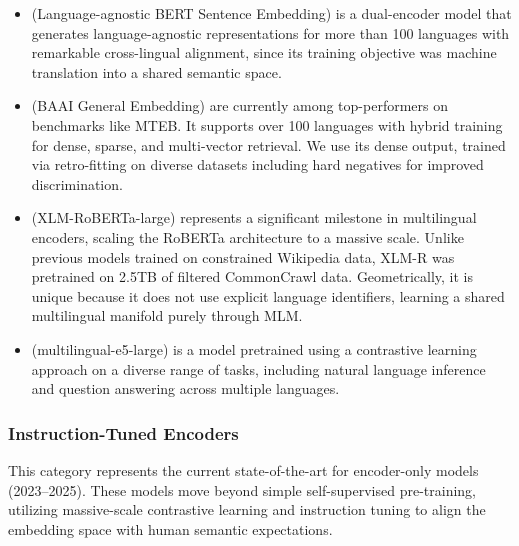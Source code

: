 \begin{itemize}
    \item \labse{} (Language-agnostic BERT Sentence Embedding) \citep{feng-etal-2022-language} is a dual-encoder model that generates language-agnostic representations for more than 100 languages with remarkable cross-lingual alignment, since its training objective was machine translation into a shared semantic space.%
    \item \bgemthree{} (BAAI General Embedding) \citep{bge-m3} are currently among top-performers on benchmarks like MTEB. It supports over 100 languages with hybrid training for dense, sparse, and multi-vector retrieval. We use its dense output, trained via retro-fitting on diverse datasets including hard negatives for improved discrimination.
    \item \xlmr{} (XLM-RoBERTa-large)
     \citep{xlm-r} represents a significant milestone in multilingual encoders, scaling the RoBERTa architecture to a massive scale. Unlike previous models trained on constrained Wikipedia data, XLM-R was pretrained on 2.5TB of filtered CommonCrawl data. Geometrically, it is unique because it does not use explicit language identifiers, learning a shared multilingual manifold purely through MLM. %
    \item \mepet{} (multilingual-e5-large) \citep{wang2024multilingual} is a model pretrained using a contrastive learning approach on a diverse range of tasks, including natural language inference and question answering across multiple languages.
\end{itemize}

\subsubsection{Instruction-Tuned Encoders} 
This category represents the current state-of-the-art for encoder-only models (2023--2025). These models move beyond simple self-supervised pre-training, utilizing massive-scale contrastive learning and instruction tuning to align the embedding space with human semantic expectations.

